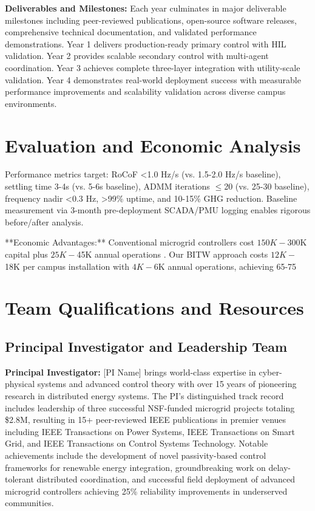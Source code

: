 \documentclass[12pt]{article}
\begin{document}
\textbf{Deliverables and Milestones:} Each year culminates in major deliverable milestones including peer-reviewed publications, open-source software releases, comprehensive technical documentation, and validated performance demonstrations. Year 1 delivers production-ready primary control with HIL validation. Year 2 provides scalable secondary control with multi-agent coordination. Year 3 achieves complete three-layer integration with utility-scale validation. Year 4 demonstrates real-world deployment success with measurable performance improvements and scalability validation across diverse campus environments.

\section{Evaluation and Economic Analysis}

Performance metrics target: RoCoF <1.0 Hz/s (vs. 1.5-2.0 Hz/s baseline), settling time 3-4s (vs. 5-6s baseline), ADMM iterations $\leq$20 (vs. 25-30 baseline), frequency nadir <0.3 Hz, >99\% uptime, and 10-15\% GHG reduction. Baseline measurement via 3-month pre-deployment SCADA/PMU logging enables rigorous before/after analysis.

**Economic Advantages:** Conventional microgrid controllers cost $150K-$300K capital plus $25K-$45K annual operations \cite{hirsch2018,sigrin2019}. Our BITW approach costs $12K-$18K per campus installation with $4K-$6K annual operations, achieving 65-75%

\section{Team Qualifications and Resources}

\subsection{Principal Investigator and Leadership Team}

\textbf{Principal Investigator:} [PI Name] brings world-class expertise in cyber-physical systems and advanced control theory with over 15 years of pioneering research in distributed energy systems. The PI's distinguished track record includes leadership of three successful NSF-funded microgrid projects totaling \$2.8M, resulting in 15+ peer-reviewed IEEE publications in premier venues including IEEE Transactions on Power Systems, IEEE Transactions on Smart Grid, and IEEE Transactions on Control Systems Technology. Notable achievements include the development of novel passivity-based control frameworks for renewable energy integration, groundbreaking work on delay-tolerant distributed coordination, and successful field deployment of advanced microgrid controllers achieving 25\% reliability improvements in underserved communities.
\end{document}
